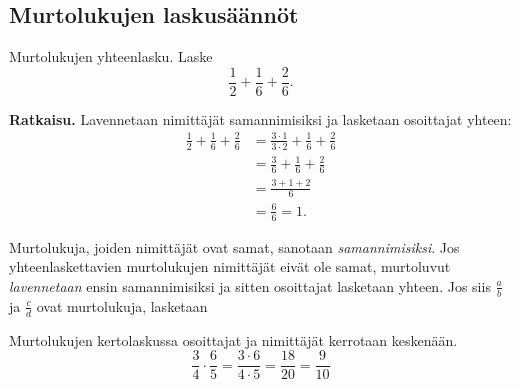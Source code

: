 \subsection*{Murtolukujen laskusäännöt}

\begin{esimerkki}
        Murtolukujen yhteenlasku. Laske
        \[
        \frac{1}{2} + \frac{1}{6} + \frac{2}{6}.
        \]
        
        \textbf{Ratkaisu.}
        Lavennetaan nimittäjät samannimisiksi ja lasketaan osoittajat yhteen:
        \begin{align*}
            \frac{1}{2} + \frac{1}{6} + \frac{2}{6} &=\frac{3\cdot 1}{3\cdot 2} + \frac{1}{6} + \frac{2}{6}\\
            										&=\frac{3}{6} + \frac{1}{6} + \frac{2}{6}\\
           											&= \frac{3+1+2}{6}\\
           											&= \frac{6}{6} = 1.
        \end{align*}
    \end{esimerkki}


    Murtolukuja, joiden nimittäjät ovat samat, sanotaan \emph{samannimisiksi}.
    Jos yhteenlaskettavien murtolukujen nimittäjät eivät ole samat, murtoluvut
    \emph{lavennetaan} ensin samannimisiksi ja sitten osoittajat lasketaan yhteen.
    Jos siis $\frac{a}{b}$ ja $\frac{c}{d}$ ovat murtolukuja, lasketaan


\begin{esimerkki}
        Murtolukujen kertolaskussa osoittajat ja nimittäjät kerrotaan keskenään.
      \[
        \frac{3}{4}\cdot \frac{6}{5}= \frac{3\cdot 6}{4\cdot 5}= \frac{18}{20}=\frac{9}{10}
        \]
    \end{esimerkki}

